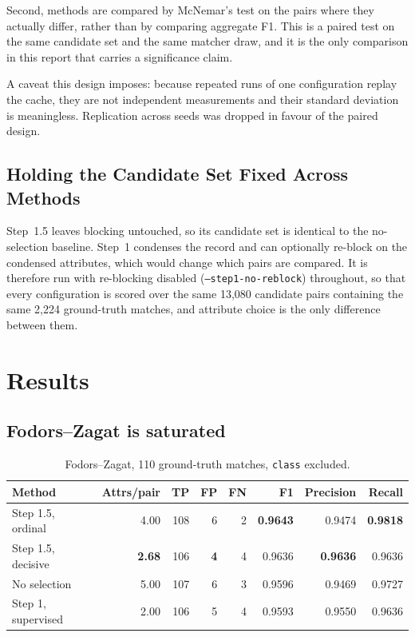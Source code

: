 \documentclass[11pt]{article}
\begin{document}
Second, methods are compared by McNemar's test on the pairs where they actually differ,
rather than by comparing aggregate F1. This is a paired test on the same candidate set and
the same matcher draw, and it is the only comparison in this report that carries a
significance claim.

A caveat this design imposes: because repeated runs of one configuration replay the cache,
they are not independent measurements and their standard deviation is meaningless.
Replication across seeds was dropped in favour of the paired design.

\subsection{Holding the Candidate Set Fixed Across Methods}
\label{sec:reblock}

Step~1.5 leaves blocking untouched, so its candidate set is identical to the no-selection
baseline. Step~1 condenses the record and can optionally re-block on the condensed
attributes, which would change which pairs are compared. It is therefore run with
re-blocking disabled (\texttt{--step1-no-reblock}) throughout, so that every configuration is
scored over the same 13{,}080 candidate pairs containing the same 2{,}224 ground-truth
matches, and attribute choice is the only difference between them.

\section{Results}

\subsection{Fodors--Zagat is saturated}

\begin{table}[h]
\centering
\begin{tabular}{lrrrrrrr}
\toprule
Method & Attrs/pair & TP & FP & FN & F1 & Precision & Recall \\
\midrule
Step 1.5, ordinal      & 4.00 & 108 & 6 & 2 & \textbf{0.9643} & 0.9474 & \textbf{0.9818} \\
Step 1.5, decisive     & \textbf{2.68} & 106 & \textbf{4} & 4 & 0.9636 & \textbf{0.9636} & 0.9636 \\
No selection           & 5.00 & 107 & 6 & 3 & 0.9596 & 0.9469 & 0.9727 \\
Step 1, supervised     & 2.00 & 106 & 5 & 4 & 0.9593 & 0.9550 & 0.9636 \\
\bottomrule
\end{tabular}
\caption{Fodors--Zagat, 110 ground-truth matches, \texttt{class} excluded.}
\end{table}
\end{document}
